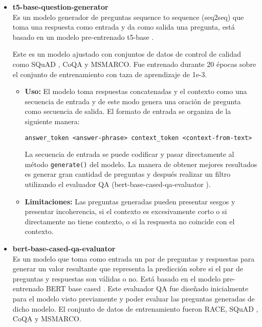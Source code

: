 \documentclass[../Main.tex]{subfiles}
\begin{document}
    \begin{itemize}
	\item \textbf{t5-base-question-generator} \cite{47}\\
	Es un modelo generador de preguntas sequence to sequence (seq2seq) que toma una respuesta como entrada y da como salida una pregunta, está basado en un modelo pre-entrenado t5-base \cite{48}. %
	
	Este es un modelo ajustado con conjuntos de datos de control de calidad como SQuAD , CoQA y MSMARCO. Fue entrenado durante 20 épocas sobre el conjunto de entrenamiento con taza de aprendizaje de 1e-3.
	
	\begin{itemize}
	    \item \textbf{Uso:} El modelo toma respuestas concatenadas y el contexto como una secuencia de entrada y de este modo genera una oración de pregunta como secuencia de salida. El formato de entrada se organiza de la siguiente manera:
	    
    	    \begin{center}
    	        \texttt{answer\_token <answer-phrase> context\_token  <context-from-text>}
    	    \end{center}
    	    
    	    La secuencia de entrada se puede codificar y pasar directamente al método \texttt{generate()} del modelo. La manera de obtener mejores resultados es generar gran cantidad de preguntas y después realizar un filtro utilizando el evaluador QA (bert-base-cased-qa-evaluator \cite{49}).
	
	    \item \textbf{Limitaciones:} Las preguntas generadas pueden presentar sesgos y presentar incoherencia, si el contexto es excesivamente corto o si directamente no tiene contexto, o si la respuesta no coincide con el contexto.
	\end{itemize}
	
	
	
	\item \textbf{bert-base-cased-qa-evaluator} \cite{49} \\
	Es un modelo que toma como entrada un par de preguntas y respuestas para generar un valor resultante que representa la predicción sobre si el par de preguntas y respuestas son válidas o no. Está basado en el modelo pre-entrenado BERT base cased \cite{50}. %
	Este evaluador QA fue diseñado inicialmente para el modelo visto previamente y poder evaluar las preguntas generadas de dicho modelo. El conjunto de datos de entrenamiento fueron RACE, SQuAD , CoQA y MSMARCO.


\end{itemize}
\end{document}
